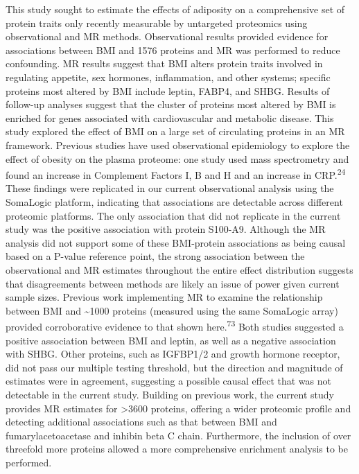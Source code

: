 \documentclass[11pt,twoside]{bristolthesis}
\begin{document}
This study sought to estimate the effects of adiposity on a comprehensive set of protein traits only recently measurable by untargeted proteomics using observational and MR methods. Observational results provided evidence for associations between BMI and 1576 proteins and MR was performed to reduce confounding. MR results suggest that BMI alters protein traits involved in regulating appetite, sex hormones, inflammation, and other systems; specific proteins most altered by BMI include leptin, FABP4, and SHBG. Results of follow-up analyses suggest that the cluster of proteins most altered by BMI is enriched for genes associated with cardiovascular and metabolic disease.
This study explored the effect of BMI on a large set of circulating proteins in an MR framework. Previous studies have used observational epidemiology to explore the effect of obesity on the plasma proteome: one study used mass spectrometry and found an increase in Complement Factors I, B and H and an increase in CRP.\textsuperscript{24} These findings were replicated in our current observational analysis using the SomaLogic platform, indicating that associations are detectable across different proteomic platforms. The only association that did not replicate in the current study was the positive association with protein S100-A9. Although the MR analysis did not support some of these BMI-protein associations as being causal based on a P-value reference point, the strong association between the observational and MR estimates throughout the entire effect distribution suggests that disagreements between methods are likely an issue of power given current sample sizes.
Previous work implementing MR to examine the relationship between BMI and \textasciitilde1000 proteins (measured using the same SomaLogic array) provided corroborative evidence to that shown here.\textsuperscript{73} Both studies suggested a positive association between BMI and leptin, as well as a negative association with SHBG. Other proteins, such as IGFBP1/2 and growth hormone receptor, did not pass our multiple testing threshold, but the direction and magnitude of estimates were in agreement, suggesting a possible causal effect that was not detectable in the current study. Building on previous work, the current study provides MR estimates for \textgreater3600 proteins, offering a wider proteomic profile and detecting additional associations such as that between BMI and fumarylacetoacetase and inhibin beta C chain. Furthermore, the inclusion of over threefold more proteins allowed a more comprehensive enrichment analysis to be performed.
\end{document}
